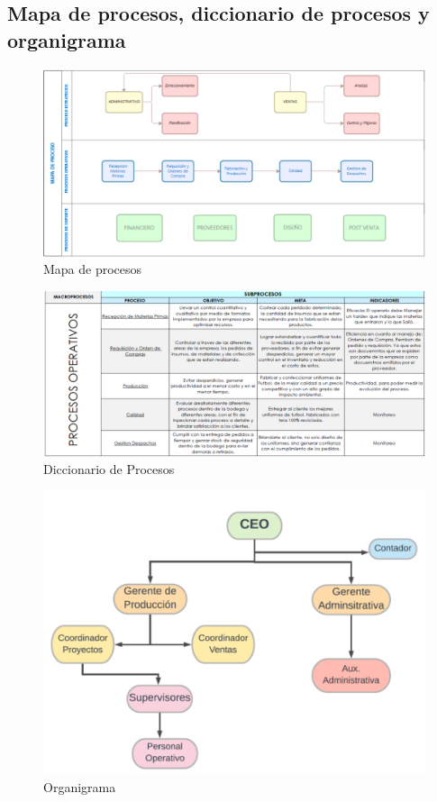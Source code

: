 \documentclass[11pt]{article}
\begin{document}
\subsection{Mapa de procesos, diccionario de procesos y organigrama}
\label{sec:orgcf047ed}
\begin{figure}[htbp]
\centering
\includegraphics[width=.9\linewidth]{./assets/build/mapa_procesos.png}
\caption{\label{fig:org85bcfbc}Mapa de procesos}
\end{figure}

\begin{figure}[htbp]
\centering
\includegraphics[width=.9\linewidth]{./assets/build/diccionario_procesos.png}
\caption{\label{fig:org2565212}Diccionario de Procesos}
\end{figure}

\begin{figure}[htbp]
\centering
\includegraphics[width=.9\linewidth]{./assets/build/organigrama.png}
\caption{\label{fig:orgbe62c93}Organigrama}
\end{figure}
\end{document}
